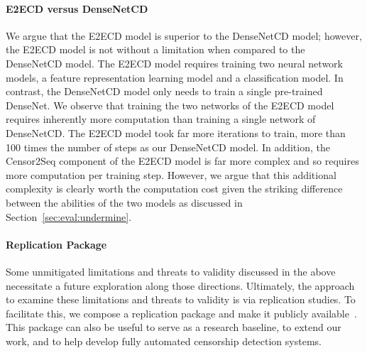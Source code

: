 \paragraph{E2ECD versus DenseNetCD}
We argue that the E2ECD model is superior to the DenseNetCD model; however, 
the E2ECD model is not without a limitation when compared to the DenseNetCD model.
The E2ECD model requires training two neural network models, a feature
representation learning model and a classification model. In contrast, the
DenseNetCD model only needs to train a single pre-trained DenseNet. We observe
that training the two networks of the E2ECD model requires inherently more
computation than training a single network of DenseNetCD. The E2ECD model took
far more iterations to train, more than 100 times the number of steps as our
DenseNetCD model. In addition, the Censor2Seq component of the E2ECD model is
far more complex and so requires more computation per training step. However,
we argue that this additional complexity is clearly worth the computation cost
given the striking difference between the abilities of the two models as 
discussed in Section~\ref{sec:eval:undermine}.


\paragraph{Replication Package}
Some unmitigated limitations and threats to validity discussed in the above necessitate 
a future exploration along those directions. Ultimately, the approach to examine 
these limitations and threats to
validity is via replication studies. To facilitate this, we compose a
replication package and make it publicly
available~\cite{shawn_p_duncan_censored_2022}.  This package can also be 
useful to serve as a research baseline, to extend our work,  and to help develop
fully automated censorship detection systems.



